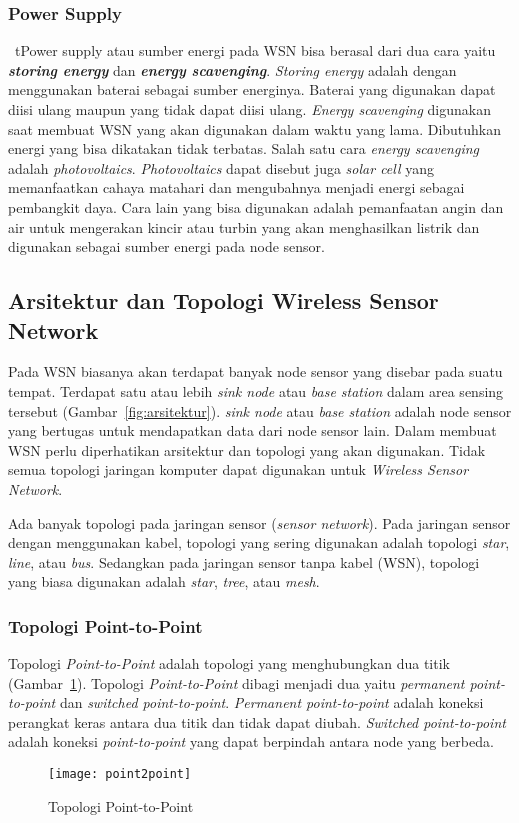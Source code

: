 \subsubsection{Power Supply}
\
t{Power supply} atau sumber energi pada WSN bisa berasal dari dua cara yaitu \textbf{\textit{storing energy}} dan \textbf{\textit{energy scavenging}}. \textit{Storing energy} adalah dengan menggunakan baterai sebagai sumber energinya. Baterai yang digunakan dapat diisi ulang maupun yang tidak dapat diisi ulang. \textit{Energy scavenging} digunakan saat membuat WSN yang akan digunakan dalam waktu yang lama. Dibutuhkan energi yang bisa dikatakan tidak terbatas. Salah satu cara \textit{energy scavenging} adalah \textit{photovoltaics}. \textit{Photovoltaics} dapat disebut juga \textit{solar cell} yang memanfaatkan cahaya matahari dan mengubahnya menjadi energi sebagai pembangkit daya. Cara lain yang bisa digunakan adalah pemanfaatan angin dan air untuk mengerakan kincir atau turbin yang akan menghasilkan listrik dan digunakan sebagai sumber energi pada node sensor.

\subsection{Arsitektur dan Topologi Wireless Sensor Network}
Pada WSN biasanya akan terdapat banyak node sensor yang disebar pada suatu tempat. Terdapat satu atau lebih \textit{sink node} atau \textit{base station} dalam area sensing tersebut (Gambar~\ref{fig:arsitektur}). \textit{sink node} atau \textit{base station} adalah node sensor yang bertugas untuk mendapatkan data dari node sensor lain. Dalam membuat WSN perlu diperhatikan arsitektur dan topologi yang akan digunakan. Tidak semua topologi jaringan komputer dapat digunakan untuk \textit{Wireless Sensor Network}. 

Ada banyak topologi pada jaringan sensor (\textit{sensor network}). Pada jaringan sensor dengan menggunakan kabel, topologi yang sering digunakan adalah topologi \textit{star}, \textit{line}, atau \textit{bus}. Sedangkan pada jaringan sensor tanpa kabel (WSN), topologi yang biasa digunakan adalah \textit{star}, \textit{tree}, atau \textit{mesh}. 

\subsubsection{Topologi Point-to-Point}
Topologi \textit{Point-to-Point} adalah topologi yang menghubungkan dua titik (Gambar~\ref{fig:point2point}). Topologi \textit{Point-to-Point} dibagi menjadi dua yaitu \textit{permanent point-to-point} dan \textit{switched point-to-point}. \textit{Permanent point-to-point} adalah koneksi perangkat keras antara dua titik dan tidak dapat diubah. \textit{Switched point-to-point} adalah koneksi \textit{point-to-point} yang dapat berpindah antara node yang berbeda. 
\begin{figure} [H]
	\centering  
	\texttt{[image: point2point]}  
	\caption[Topologi Point-to-Point]{Topologi Point-to-Point} 
	\label{fig:point2point} 
\end{figure} 


